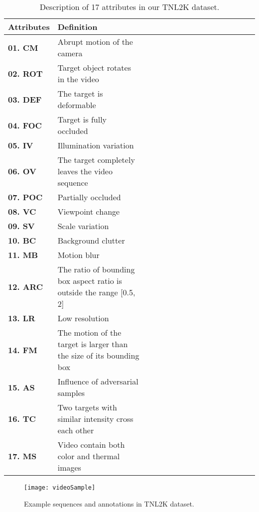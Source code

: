 \documentclass[final]{cvpr}
\begin{document}
\begin{table}[htp!]
\center
\scriptsize 
\caption{Description of 17 attributes in our TNL2K dataset.} \label{AttributeList}
\begin{tabular}{l|lcccccccccccccc}
\hline \toprule [0.8 pt]
\textbf{Attributes}    &\textbf{Definition}  \\ 
\hline
\textbf{01. CM}   	    	&Abrupt motion of the camera \\
\textbf{02. ROT}   	    &Target object rotates in the video \\
\textbf{03. DEF}   	    &The target is deformable \\
\textbf{04. FOC}   	    &Target is fully occluded \\
\textbf{05. IV}   	    	&Illumination variation \\ 
\textbf{06. OV}   	    	&The target completely leaves the video sequence \\ 
\textbf{07. POC}   	    &Partially occluded  \\
\textbf{08. VC}   	    	&Viewpoint change  \\
\textbf{09. SV}   	    	&Scale variation  \\
\textbf{10. BC}   	    	&Background clutter  \\
\textbf{11. MB}   	    	&Motion blur  \\
\textbf{12. ARC}   	    &The ratio of bounding box aspect ratio is outside the range [0.5, 2]   \\
\textbf{13. LR}   	    	&Low resolution  \\
\textbf{14. FM}   	    	&The motion of the target is larger than the size of its bounding box  \\
\textbf{15. AS}   	    	&Influence of adversarial samples  \\
\textbf{16. TC}			&Two targets with similar intensity cross each other \\ 
\textbf{17. MS}			&Video contain both color and thermal images \\ 
\hline \toprule [0.8 pt]
\end{tabular}
\end{table}	



\begin{figure}[!htb]
\center
\texttt{[image: videoSample]}
\caption{Example sequences and annotations in TNL2K dataset. }
\label{videoSample}
\end{figure} 	
\end{document}
